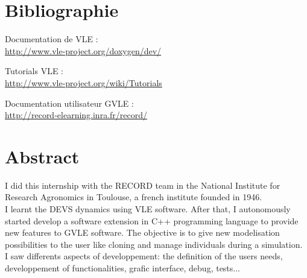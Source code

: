 \documentclass[a4paper,11pt,final]{report}
\begin{document}
\sloppy %

 



\tableofcontents %







 



\chapter{Bibliographie}
\noindent Documentation de VLE :\\
\url{http://www.vle-project.org/doxygen/dev/}\\
\vspace{0.5cm}

\noindent Tutorials VLE :\\
\url{http://www.vle-project.org/wiki/Tutorials}\\
\vspace{0.5cm}

\noindent Documentation utilisateur GVLE :\\
\url{http://record-elearning.inra.fr/record/}

\chapter{Abstract}
I did this internship with the RECORD team in the National Institute for Research Agronomics in Toulouse, a french institute founded in 1946.\\
I learnt the DEVS dynamics using VLE software. After that, I autonomously started develop a software extension in C++ programming language to provide new features to GVLE software. The objective is to give new modelisation possibilities to the user like cloning and manage individuals during a simulation.\\
I saw differents aspects of developpement: the definition of the users needs, developpement of functionalities, grafic interface, debug, tests...



\appendix
\end{document}
